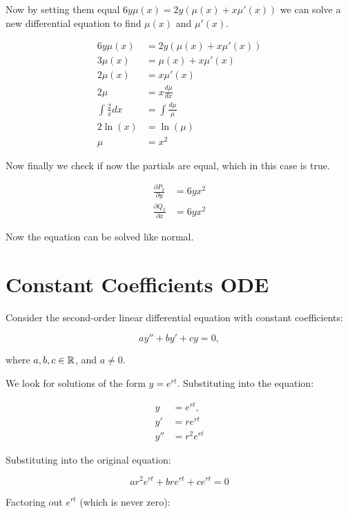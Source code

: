 Now by setting them equal \(6y\mu(x) = 2y(\mu(x) + x\mu'(x))\) we can solve a new differential equation
to find \(\mu(x)\) and \(\mu'(x)\).

\begin{align*}
    6y\mu(x)           & = 2y(\mu(x) + x\mu'(x)) \\
    3\mu(x)            & = \mu(x) + x\mu'(x)     \\
    2\mu(x)            & = x\mu'(x)              \\
    2\mu               & = x \frac{d\mu}{dx}     \\
    \int \frac{2}{x}dx & = \int \frac{d\mu}{\mu} \\
    2\ln(x)            & = \ln(\mu)              \\
    \mu                & = x^2
\end{align*}

Now finally we check if now the partials are equal, which in this case is true.

\begin{align*}
    \frac{\partial P_2}{\partial y} & = 6yx^2 \\
    \frac{\partial Q_2}{\partial x} & = 6yx^2
\end{align*}

Now the equation can be solved like normal.

\section{Constant Coefficients ODE}

Consider the second-order linear differential equation with constant coefficients:

\[
    a y'' + b y' + c y = 0,
\]

where \( a, b, c \in \mathbb{R} \), and \( a \neq 0 \).

We look for solutions of the form \( y = e^{rt} \). Substituting into the equation:

\begin{align*}
    y   & = e^{rt},     \\
    y'  & = r e^{rt}    \\
    y'' & =  r^2 e^{rt}
\end{align*}

Substituting into the original equation:

\[
    ar^2 e^{rt} + bre^{rt} + ce^{rt} = 0
\]

Factoring out \( e^{rt} \) (which is never zero):

